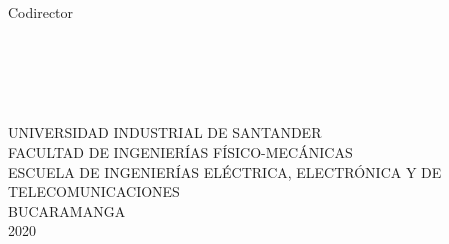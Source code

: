\noindent \begin{center}
{\large Codirector }\\
{\Large \textsc{\insertcodirector} }\textbf{\large }\\
{\large \insertcargocodirector}
\par\end{center}{\large \par}

\noindent \begin{center}
\textbf{\large ~}
\par\end{center}{\large \par}

\noindent \begin{center}
\textbf{\large ~}
\par\end{center}{\large \par}


\noindent \begin{center}%
{\large UNIVERSIDAD INDUSTRIAL DE SANTANDER
}\\
{\large FACULTAD DE INGENIERÍAS FÍSICO-MECÁNICAS}\\ %
{\large ESCUELA DE INGENIERÍAS ELÉCTRICA, ELECTRÓNICA Y DE TELECOMUNICACIONES}\\ %
{\large BUCARAMANGA}\\%
{\large 2020}%
\par\end{center}{\large \par}


